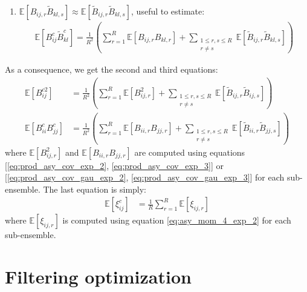 \documentclass[12pt]{scrartcl}
\begin{document}
\begin{enumerate}
\begin{enumerate}
\item $\mathbb{E} \left[B_{ij,r} \widetilde{B}_{kl,s}\right] \approx \mathbb{E} \left[\widetilde{B}_{ij,r} \widetilde{B}_{kl,s}\right]$, useful to estimate:
\begin{align}
\mathbb{E} \left[B^c_{ij} \widetilde{B}^c_{kl} \right] = \frac{1}{R^2} \left(\sum_{r=1}^R \mathbb{E} \left[B_{ij,r} B_{kl,r}\right] + \sum_{\substack{1 \le r,s \le R\\r \ne s}} \mathbb{E} \left[\widetilde{B}_{ij,r} \widetilde{B}_{kl,s}\right]\right)
\end{align}
\end{enumerate}
As a consequence, we get the second and third equations:
\begin{subequations}
\begin{align}
\mathbb{E} \left[B^{c2}_{ij} \right] & = \frac{1}{R^2} \left(\sum_{r=1}^R \mathbb{E} \left[B^2_{ij,r}\right] + \sum_{\substack{1 \le r,s \le R\\r \ne s}} \mathbb{E} \left[\widetilde{B}_{ij,r} \widetilde{B}_{ij,s}\right]\right) \\
\mathbb{E} \left[B^c_{ii} B^c_{jj} \right] & = \frac{1}{R^2} \left(\sum_{r=1}^R \mathbb{E} \left[B_{ii,r} B_{jj,r}\right] + \sum_{\substack{1 \le r,s \le R\\r \ne s}} \mathbb{E} \left[\widetilde{B}_{ii,r} \widetilde{B}_{jj,s}\right]\right)
\end{align}
\end{subequations}
where $\mathbb{E} \left[B^2_{ij,r}\right]$ and $\mathbb{E} \left[B_{ii,r} B_{jj,r}\right]$ are computed using equations [\eqref{eq:prod_asy_cov_exp_2}, \eqref{eq:prod_asy_cov_exp_3}] or [\eqref{eq:prod_asy_cov_gau_exp_2}, \eqref{eq:prod_asy_cov_gau_exp_3}] for each sub-ensemble. The last equation is simply:
\begin{align}
\mathbb{E} \left[\xi^c_{ij}\right] & = \frac{1}{R} \sum_{r=1}^R \mathbb{E} \left[\xi_{ij,r}\right] 
\end{align}
where $\mathbb{E} \left[\xi_{ij,r}\right]$ is computed using equation \eqref{eq:asy_mom_4_exp_2} for each sub-ensemble.
\end{enumerate}

\clearpage

\section{Filtering optimization}
\end{document}
